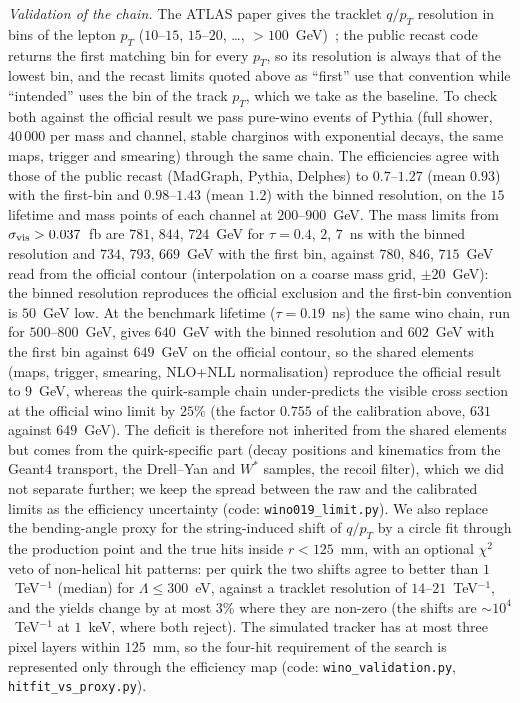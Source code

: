 \documentclass[prd,twocolumn,nofootinbib,superscriptaddress,amsmath,amssymb]{revtex4-2}
\begin{document}
\emph{Validation of the chain.} The ATLAS paper gives the tracklet $q/p_T$ resolution in bins of the lepton $p_T$ ($10$--$15$, $15$--$20$, \ldots, $>100$~GeV)~\cite{ATLAS:DT}; the public recast code returns the first matching bin for every $p_T$, so its resolution is always that of the lowest bin, and the recast limits quoted above as ``first'' use that convention while ``intended'' uses the bin of the track $p_T$, which we take as the baseline. To check both against the official result we pass pure-wino events of Pythia (full shower, $40\,000$ per mass and channel, stable charginos with exponential decays, the same maps, trigger and smearing) through the same chain. The efficiencies agree with those of the public recast (MadGraph, Pythia, Delphes) to $0.7$--$1.27$ (mean $0.93$) with the first-bin and $0.98$--$1.43$ (mean $1.2$) with the binned resolution, on the $15$ lifetime and mass points of each channel at $200$--$900$~GeV. The mass limits from $\sigma_{\rm vis}>0.037$~fb are $781$, $844$, $724$~GeV for $\tau=0.4$, $2$, $7$~ns with the binned resolution and $734$, $793$, $669$~GeV with the first bin, against $780$, $846$, $715$~GeV read from the official contour (interpolation on a coarse mass grid, $\pm20$~GeV): the binned resolution reproduces the official exclusion and the first-bin convention is $50$~GeV low. At the benchmark lifetime ($\tau=0.19$~ns) the same wino chain, run for $500$--$800$~GeV, gives $640$~GeV with the binned resolution and $602$~GeV with the first bin against $649$~GeV on the official contour, so the shared elements (maps, trigger, smearing, NLO+NLL normalisation) reproduce the official result to $9$~GeV, whereas the quirk-sample chain under-predicts the visible cross section at the official wino limit by $25\%$ (the factor $0.755$ of the calibration above, $631$ against $649$~GeV). The deficit is therefore not inherited from the shared elements but comes from the quirk-specific part (decay positions and kinematics from the Geant4 transport, the Drell--Yan and $W^*$ samples, the recoil filter), which we did not separate further; we keep the spread between the raw and the calibrated limits as the efficiency uncertainty (code: \texttt{wino019\_limit.py}). We also replace the bending-angle proxy for the string-induced shift of $q/p_T$ by a circle fit through the production point and the true hits inside $r<125$~mm, with an optional $\chi^2$ veto of non-helical hit patterns: per quirk the two shifts agree to better than $1$~TeV$^{-1}$ (median) for $\Lambda\le300$~eV, against a tracklet resolution of $14$--$21$~TeV$^{-1}$, and the yields change by at most $3\%$ where they are non-zero (the shifts are $\sim10^4$~TeV$^{-1}$ at $1$~keV, where both reject). The simulated tracker has at most three pixel layers within $125$~mm, so the four-hit requirement of the search is represented only through the efficiency map (code: \texttt{wino\_validation.py}, \texttt{hitfit\_vs\_proxy.py}).
\end{document}
